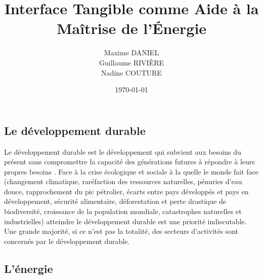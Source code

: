\documentclass[10pt,a5paper,twoside]{article}
\title{Interface Tangible comme Aide à la Maîtrise de l'Énergie}
\author{Maxime DANIEL\\ Guillaume RIVIÈRE\\ Nadine COUTURE}
\date{\today}
\begin{document}
\maketitle
{}

\clearpage
\tableofcontents
\clearpage

\subsection{Le développement durable}\label{le-duxe9veloppement-durable}

Le développement durable est le développement qui subvient aux besoins
du présent sans compromettre la capacité des générations futures à
répondre à leurs propres besoins \citep{Hariem1985world}. Face à la
crise écologique et sociale à la quelle le monde fait face (changement
climatique, raréfaction des ressources naturelles, pénuries d'eau douce,
rapprochement du pic pétrolier, écarts entre pays développés et pays en
développement, sécurité alimentaire, déforestation et perte drastique de
biodiversité, croissance de la population mondiale, catastrophes
naturelles et industrielles) atteindre le développement durable est une
priorité indiscutable. Une grande majorité, si ce n'est pas la totalité,
des secteurs d'activités sont concernés par le développement durable.

\subsection{L'énergie}\label{luxe9nergie}
\end{document}
